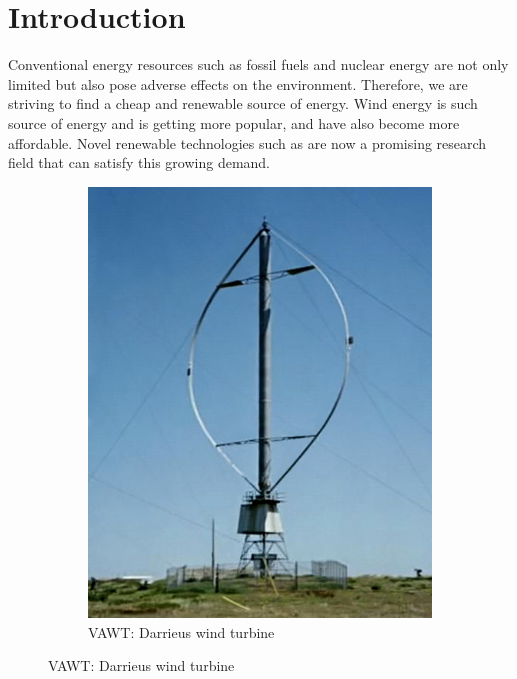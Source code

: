 \chapter{Introduction}
\label{ch:introduction}
Conventional energy resources such as fossil fuels and nuclear energy are not only limited but also pose adverse effects on the environment. Therefore, we are striving to find a cheap and renewable source of energy. Wind energy is such source of energy and is getting more popular, and have also become more affordable. Novel renewable technologies such as  are now a promising research field that can satisfy this growing demand.

	\begin{figure}[!b]
        \centering
        \begin{subfigure}[b]{0.25\textwidth}
                \includegraphics[height=0.2\textheight]{figures/introduction/Darrieus-windmill.jpg}
                \caption{VAWT: Darrieus wind turbine\cite{darrieusWindmill}}
                \label{fig:Darrieus-windmill}
        \end{subfigure}%
        \qquad \qquad%

\end{figure}

